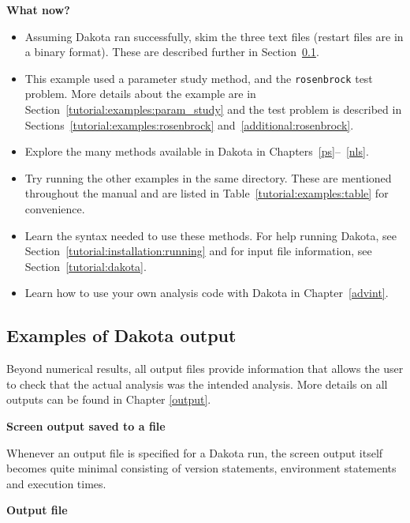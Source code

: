 {\bf What now?}
\begin{itemize}
  \item Assuming Dakota ran successfully, skim the three text files (restart files are in a binary format). These are described further in 
Section~\ref{tutorial:quickstart:output}.
  \item This example used a parameter study method, and the 
\texttt{rosenbrock} test problem. More details about the example are in
Section~\ref{tutorial:examples:param_study} and the test problem is 
described in Sections~\ref{tutorial:examples:rosenbrock} and~\ref{additional:rosenbrock}.
  \item Explore the many methods available in Dakota in
    Chapters~\ref{ps}--~\ref{nls}.
  \item Try running the other examples in the same directory. These are mentioned
    throughout the manual and are listed in Table~\ref{tutorial:examples:table} 
    for convenience.
  \item Learn the syntax needed to use these methods. For help running Dakota, 
see Section~\ref{tutorial:installation:running} and for input file 
information, see Section~\ref{tutorial:dakota}. 
  \item Learn how to use your own analysis code with Dakota in Chapter~\ref{advint}.
\end{itemize}


\subsection {Examples of Dakota output}\label{tutorial:quickstart:output}
Beyond numerical results, all output files provide information that
allows the user to check that the actual analysis was the intended
analysis. More details on all outputs can be found in Chapter \ref{output}.

{\textbf{Screen output saved to a file}}

Whenever an output file is specified for a Dakota run, the screen
output itself becomes quite minimal consisting of version statements,
environment statements and execution times.

{\textbf{Output file}}

